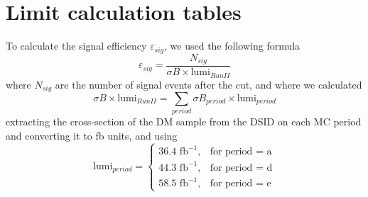 \documentclass[12pt, a4paper]{book}
\begin{document}
\chapter{Limit calculation tables}\label{chap:Limit_Tabs}
To calculate the signal efficiency $\varepsilon_{sig}$, we used the following formula
$$
\varepsilon_{sig}=\frac{N_{sig}}{\sigma B \times \text{lumi}_{RunII}}
$$
where $N_{sig}$ are the number of signal events after the cut, and where we calculated 
$$
\sigma B \times \text{lumi}_{RunII} = \sum_{period}\sigma B_{period} \times \text{lumi}_{period}
$$
extracting the cross-section of the DM sample from the DSID on each MC period and converting it to fb units, and using
$$
\text{lumi}_{period} = \begin{cases}
               36.4\text{ fb}^{-1},& \text{for period = a}\\
               44.3\text{ fb}^{-1},& \text{for  period = d}\\
               58.5\text{ fb}^{-1},& \text{for  period = e}
               \end{cases}
$$
\end{document}
